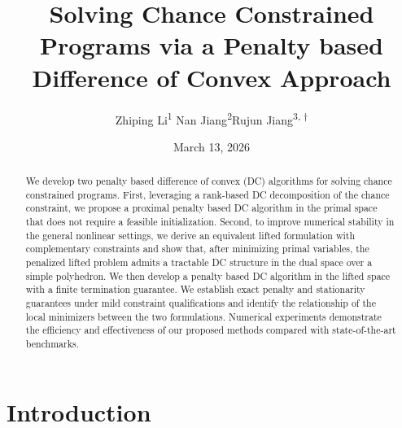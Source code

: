 \documentclass[11pt]{article}
\title{Solving Chance Constrained Programs via a Penalty based Difference of Convex Approach}
\date{March 13, 2026}
\author{Zhiping Li\textsuperscript{1} \quad\quad\quad\quad Nan Jiang\textsuperscript{2}\quad\quad\quad\quad Rujun Jiang\textsuperscript{3, $\dag$} \\
}
\begin{document}
\maketitle

    \begingroup
    \begin{NoHyper}
    \renewcommand\thefootnote{1}
    \renewcommand\thefootnote{2}
    \renewcommand\thefootnote{3}
    \renewcommand\thefootnote{$\dag$}
    \end{NoHyper}
    \endgroup

	\onehalfspacing

\begin{abstract}
We develop two penalty based difference of convex (DC) algorithms for solving chance constrained programs. First, leveraging a rank-based DC decomposition of the chance constraint, we propose a proximal penalty based DC algorithm in the primal space that does not require a feasible initialization. Second, to improve numerical stability in the general nonlinear settings, we derive an equivalent lifted formulation with complementary constraints and show that, after minimizing primal variables, the penalized lifted problem admits a tractable DC structure in the dual space over a simple polyhedron. We then develop a penalty based DC algorithm in the lifted space with a finite termination guarantee. We establish exact penalty and stationarity guarantees under mild constraint qualifications
and identify the relationship of the local minimizers between the two formulations. Numerical experiments demonstrate the efficiency and effectiveness of our proposed methods compared with state-of-the-art benchmarks.
\end{abstract}

\section{Introduction}
\end{document}
